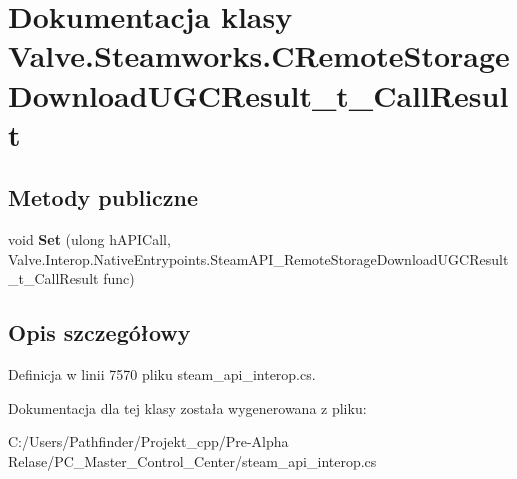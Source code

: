 \hypertarget{class_valve_1_1_steamworks_1_1_c_remote_storage_download_u_g_c_result__t___call_result}{}\section{Dokumentacja klasy Valve.\+Steamworks.\+C\+Remote\+Storage\+Download\+U\+G\+C\+Result\+\_\+t\+\_\+\+Call\+Result}
\label{class_valve_1_1_steamworks_1_1_c_remote_storage_download_u_g_c_result__t___call_result}
\subsection*{Metody publiczne}
\begin{DoxyCompactItemize}
\item 
\mbox{\label{class_valve_1_1_steamworks_1_1_c_remote_storage_download_u_g_c_result__t___call_result_a2d09e786e9f755cac36a57f92378645d}} 
void {\bfseries Set} (ulong h\+A\+P\+I\+Call, Valve.\+Interop.\+Native\+Entrypoints.\+Steam\+A\+P\+I\+\_\+\+Remote\+Storage\+Download\+U\+G\+C\+Result\+\_\+t\+\_\+\+Call\+Result func)
\end{DoxyCompactItemize}


\subsection{Opis szczegółowy}


Definicja w linii 7570 pliku steam\+\_\+api\+\_\+interop.\+cs.



Dokumentacja dla tej klasy została wygenerowana z pliku\+:\begin{DoxyCompactItemize}
\item 
C\+:/\+Users/\+Pathfinder/\+Projekt\+\_\+cpp/\+Pre-\/\+Alpha Relase/\+P\+C\+\_\+\+Master\+\_\+\+Control\+\_\+\+Center/steam\+\_\+api\+\_\+interop.\+cs\end{DoxyCompactItemize}
